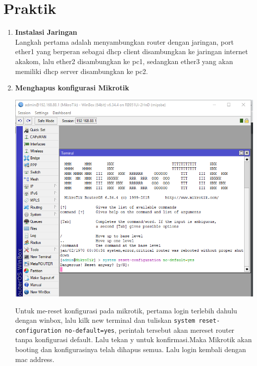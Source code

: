 \documentclass[a4paper,12pt]{article}
\begin{document}
\section{Praktik}
\begin{enumerate}
	\item \textbf{Instalasi Jaringan}\\
	Langkah pertama adalah menyambungkan router dengan jaringan, port ether1 yang berperan sebagai dhcp client disambungkan ke jaringan internet akakom, lalu ether2 disambungkan ke pc1, sedangkan ether3 yang akan memiliki dhcp server disambungkan ke pc2. 
	
	\item \textbf{Menghapus konfigurasi Mikrotik}\\
	\begin{center}
		\includegraphics[scale=.4]{Capture1}
	\end{center}
	Untuk me-reset konfigurasi pada mikrotik, pertama login terlebih dahulu dengan winbox, lalu kilk new terminal dan tuliskan \texttt{system reset-configuration no-default=yes}, perintah tersebut akan mereset router tanpa konfigurasi default. Lalu tekan y untuk konfirmasi.Maka Mikrotik akan booting dan konfigurasinya telah dihapus semua. Lalu login kembali dengan mac address.
	

\end{enumerate}
\end{document}

